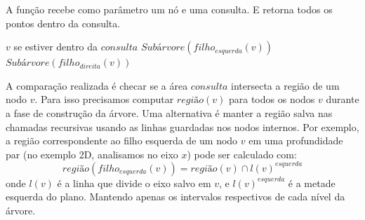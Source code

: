 \begin{algorithm}
    \caption{A função  recebe como parâmetro um nó e uma 
    consulta.
     E retorna todos os pontos dentro da consulta.}
    \begin{algorithmic}[1]
        \Return  $v$ se estiver dentro da $consulta$
        \Else
            \State \Return $Subárvore( filho_{esquerda}(v) )$
            \Else
                \State {}
                \EndIf
            \EndIf
            \State \Return $Subárvore(filho_{direita}(v))$
            \Else
                \State {}
                \EndIf
            \EndIf
        \EndIf
    \EndFunction
    \end{algorithmic}
\end{algorithm}

A comparação realizada é checar se a área \(consulta\) intersecta a região
de um nodo \(v\). Para isso precisamos computar \(região(v)\) para todos os nodos \(v\)
durante a fase de construção da árvore.
Uma alternativa é manter a região salva nas chamadas recursivas usando as linhas guardadas
nos nodos internos. Por exemplo, a região correspondente ao filho esquerda de um nodo
\(v\) em uma profundidade par (no exemplo 2D, analisamos no eixo \(x\)) pode ser calculado com:
\[
    região(filho_{esquerda}(v)) = região(v) \cap l(v)^{esquerda}
\]
onde \(l(v)\) é a linha que divide o eixo salvo em \(v\), e \(l(v)^{esquerda}\) é a metade
esquerda do plano.
Mantendo apenas os intervalos respectivos de cada nível da árvore. 

